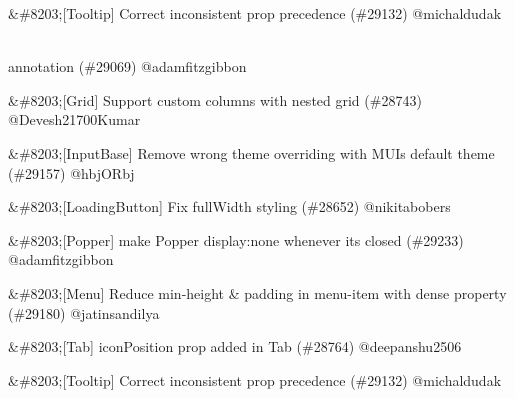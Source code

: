 \begin{DoxyRefList}
\begin{DoxyItemize}
\item \&\#8203;\mbox{[}Tooltip\mbox{]} Correct inconsistent prop precedence (\#29132) @michaldudak
\end{DoxyItemize}
\item[Page \doxylink{md__c_1_2_users_2saket_2_one_drive_2_desktop_2e_pathshala_2epathshala-_web_2node__modules_2_0dmui_2utils_2_c_h_a_n_g_e_l_o_g}{Versions} ]\hfill \\
\label{deprecated__deprecated000006}%
%
annotation (\#29069) @adamfitzgibbon
\begin{DoxyItemize}
\item \&\#8203;\mbox{[}Grid\mbox{]} Support custom columns with nested grid (\#28743) @\+Devesh21700\+Kumar
\item \&\#8203;\mbox{[}Input\+Base\mbox{]} Remove wrong theme overriding with MUI\textquotesingle{}s default theme (\#29157) @hbj\+ORbj
\item \&\#8203;\mbox{[}Loading\+Button\mbox{]} Fix {\ttfamily full\+Width} styling (\#28652) @nikitabobers
\item \&\#8203;\mbox{[}Popper\mbox{]} make Popper display\+:none whenever it\textquotesingle{}s closed (\#29233) @adamfitzgibbon
\item \&\#8203;\mbox{[}Menu\mbox{]} Reduce min-\/height \& padding in menu-\/item with dense property (\#29180) @jatinsandilya
\item \&\#8203;\mbox{[}Tab\mbox{]} {\ttfamily icon\+Position} prop added in Tab (\#28764) @deepanshu2506
\item \&\#8203;\mbox{[}Tooltip\mbox{]} Correct inconsistent prop precedence (\#29132) @michaldudak
\end{DoxyItemize}
\end{DoxyRefList}